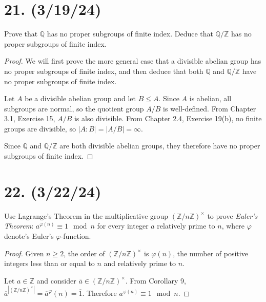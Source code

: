 \documentclass{article}
\begin{document}
\section*{21. (3/19/24)}

Prove that $\mathbb{Q}$ has no proper subgroups of finite index. Deduce that $\mathbb{Q}/\mathbb{Z}$ has no proper subgroups of finite index.

\begin{proof}
    We will first prove the more general case that a divisible abelian group has no proper subgroups of finite index, and then deduce that both $\mathbb{Q}$ and $\mathbb{Q}/\mathbb{Z}$ have no proper subgroups of finite index.

    Let $A$ be a divisible abelian group and let $B \leq A$. Since $A$ is abelian, all subgroups are normal, so the quotient group $A/B$ is well-defined. From Chapter 3.1, Exercise 15,  $A/B$ is also divisible. From Chapter 2.4, Exercise 19(b), no finite groups are divisible, so $|A:B| = |A/B| = \infty$.

    Since $\mathbb{Q}$ and $\mathbb{Q}/\mathbb{Z}$ are both divisible abelian groups, they therefore have no proper subgroups of finite index.
\end{proof}

\section*{22. (3/22/24)}

Use Lagrange's Theorem in the multiplicative group $(\mathbb{Z}/n\mathbb{Z})^\times$ to prove \emph{Euler's Theorem}: $a^{\varphi(n)} \equiv 1 \mod n$ for every integer $a$ relatively prime to $n$, where $\varphi$ denote's Euler's $\varphi$-function.

\begin{proof}
    Given $n \geq 2$, the order of $(\mathbb{Z}/n\mathbb{Z})^\times$ is $\varphi(n)$, the number of positive integers less than or equal to $n$ and relatively prime to $n$.

    Let $a \in \mathbb{Z}$ and consider $\overline{a} \in (\mathbb{Z}/n\mathbb{Z})^\times$. From Corollary 9, $\overline{a}^{|(\mathbb{Z}/n\mathbb{Z})^\times|} = \overline{a}^\varphi(n) = \overline{1}$. Therefore $a^{\varphi(n)} \equiv 1 \mod n$.
\end{proof}
\end{document}
